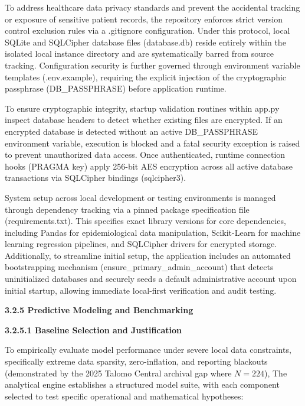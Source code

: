 \documentclass[
]{article}
\begin{document}
To address healthcare data privacy standards and prevent the accidental
tracking or exposure of sensitive patient records, the repository
enforces strict version control exclusion rules via a .gitignore
configuration. Under this protocol, local SQLite and SQLCipher database
files (database.db) reside entirely within the isolated local instance
directory and are systematically barred from source tracking.
Configuration security is further governed through environment variable
templates (.env.example), requiring the explicit injection of the
cryptographic passphrase (DB\_PASSPHRASE) before application runtime.

To ensure cryptographic integrity, startup validation routines within
app.py inspect database headers to detect whether existing files are
encrypted. If an encrypted database is detected without an active
DB\_PASSPHRASE environment variable, execution is blocked and a fatal
security exception is raised to prevent unauthorized data access. Once
authenticated, runtime connection hooks (PRAGMA key) apply 256-bit AES
encryption across all active database transactions via SQLCipher
bindings (sqlcipher3).

System setup across local development or testing environments is managed
through dependency tracking via a pinned package specification file
(requirements.txt). This specifies exact library versions for core
dependencies, including Pandas for epidemiological data manipulation,
Scikit-Learn for machine learning regression pipelines, and SQLCipher
drivers for encrypted storage. Additionally, to streamline initial
setup, the application includes an automated bootstrapping mechanism
(ensure\_primary\_admin\_account) that detects uninitialized databases
and securely seeds a default administrative account upon initial
startup, allowing immediate local-first verification and audit testing.

\textbf{3.2.5 Predictive Modeling and Benchmarking}

\textbf{3.2.5.1 Baseline Selection and Justification}

To empirically evaluate model performance under severe local data
constraints, specifically extreme data sparsity, zero-inflation, and
reporting blackouts (demonstrated by the 2025 Talomo Central archival
gap where \(N = 224\)), The analytical engine establishes a structured
model suite, with each component selected to test specific operational
and mathematical hypotheses:
\end{document}

